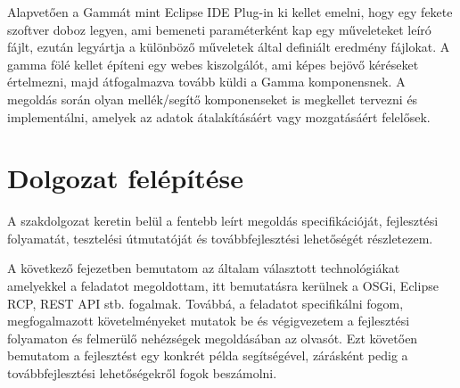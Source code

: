 Alapvetően a Gammát mint Eclipse IDE Plug-in ki kellet emelni, hogy egy fekete szoftver doboz legyen, ami bemeneti paraméterként kap egy műveleteket leíró fájlt, ezután legyártja a különböző műveletek által definiált eredmény fájlokat. A gamma fölé kellet építeni egy webes kiszolgálót, ami képes bejövő kéréseket értelmezni, majd átfogalmazva tovább küldi a Gamma komponensnek. A megoldás során olyan mellék/segítő komponenseket is megkellet tervezni és implementálni, amelyek az adatok átalakításáért vagy mozgatásáért felelősek.
\section{Dolgozat felépítése}

A szakdolgozat keretin belül a fentebb leírt megoldás specifikációját, fejlesztési folyamatát, tesztelési útmutatóját és továbbfejlesztési lehetőségét részletezem.

A következő fejezetben bemutatom az általam választott technológiákat amelyekkel a feladatot megoldottam, itt bemutatásra kerülnek a OSGi, Eclipse RCP, REST API stb. fogalmak. Továbbá, a feladatot specifikálni fogom, megfogalmazott követelményeket mutatok be és végigvezetem a fejlesztési folyamaton és felmerülő nehézségek megoldásában az olvasót. Ezt követően bemutatom a fejlesztést egy konkrét példa segítségével, zárásként pedig a továbbfejlesztési lehetőségekről fogok beszámolni.






















